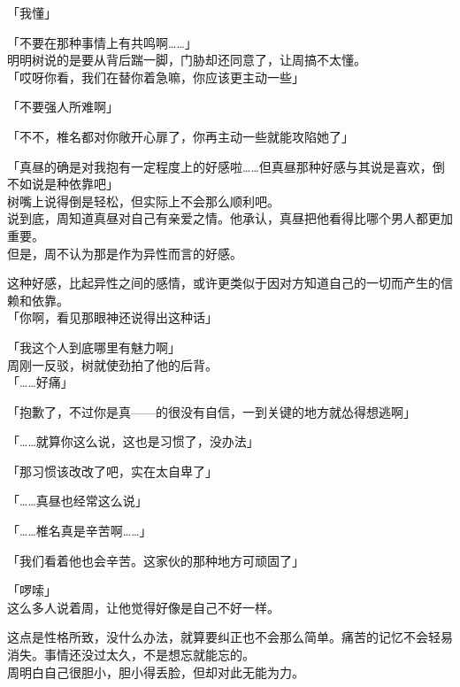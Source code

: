 「我懂」

「不要在那种事情上有共鸣啊……」\\

明明树说的是要从背后踹一脚，门胁却还同意了，让周搞不太懂。\\

「哎呀你看，我们在替你着急嘛，你应该更主动一些」

「不要强人所难啊」

「不不，椎名都对你敞开心扉了，你再主动一些就能攻陷她了」

「真昼的确是对我抱有一定程度上的好感啦……但真昼那种好感与其说是喜欢，倒不如说是种依靠吧」\\

树嘴上说得倒是轻松，但实际上不会那么顺利吧。\\

说到底，周知道真昼对自己有亲爱之情。他承认，真昼把他看得比哪个男人都更加重要。\\

但是，周不认为那是作为异性而言的好感。

这种好感，比起异性之间的感情，或许更类似于因对方知道自己的一切而产生的信赖和依靠。\\

「你啊，看见那眼神还说得出这种话」

「我这个人到底哪里有魅力啊」\\

周刚一反驳，树就使劲拍了他的后背。\\

「……好痛」

「抱歉了，不过你是真——的很没有自信，一到关键的地方就怂得想逃啊」

「……就算你这么说，这也是习惯了，没办法」

「那习惯该改改了吧，实在太自卑了」

「……真昼也经常这么说」

「……椎名真是辛苦啊……」

「我们看着他也会辛苦。这家伙的那种地方可顽固了」

「啰嗦」\\

这么多人说着周，让他觉得好像是自己不好一样。

这点是性格所致，没什么办法，就算要纠正也不会那么简单。痛苦的记忆不会轻易消失。事情还没过太久，不是想忘就能忘的。\\

周明白自己很胆小，胆小得丢脸，但却对此无能为力。\\

